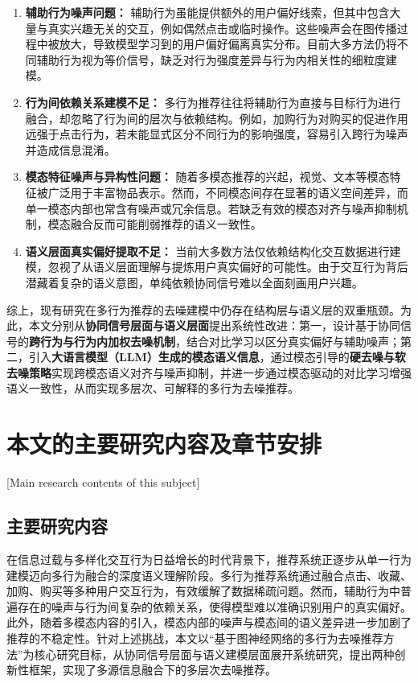 \begin{enumerate}[label={(\alph*)}]
    \item \textbf{辅助行为噪声问题：} 辅助行为虽能提供额外的用户偏好线索，但其中包含大量与真实兴趣无关的交互，例如偶然点击或临时操作。这些噪声会在图传播过程中被放大，导致模型学习到的用户偏好偏离真实分布。目前大多方法仍将不同辅助行为视为等价信号，缺乏对行为强度差异与行为内相关性的细粒度建模。

    \item \textbf{行为间依赖关系建模不足：} 多行为推荐往往将辅助行为直接与目标行为进行融合，却忽略了行为间的层次与依赖结构。例如，加购行为对购买的促进作用远强于点击行为，若未能显式区分不同行为的影响强度，容易引入跨行为噪声并造成信息混淆。

    \item \textbf{模态特征噪声与异构性问题：} 随着多模态推荐的兴起，视觉、文本等模态特征被广泛用于丰富物品表示。然而，不同模态间存在显著的语义空间差异，而单一模态内部也常含有噪声或冗余信息。若缺乏有效的模态对齐与噪声抑制机制，模态融合反而可能削弱推荐的语义一致性。

    \item \textbf{语义层面真实偏好提取不足：} 当前大多数方法仅依赖结构化交互数据进行建模，忽视了从语义层面理解与提炼用户真实偏好的可能性。由于交互行为背后潜藏着复杂的语义意图，单纯依赖协同信号难以全面刻画用户兴趣。
\end{enumerate}

综上，现有研究在多行为推荐的去噪建模中仍存在结构层与语义层的双重瓶颈。为此，本文分别从\textbf{协同信号层面与语义层面}提出系统性改进：第一，设计基于协同信号的\textbf{跨行为与行为内加权去噪机制}，结合对比学习以区分真实偏好与辅助噪声；第二，引入\textbf{大语言模型（LLM）生成的模态语义信息}，通过模态引导的\textbf{硬去噪与软去噪策略}实现跨模态语义对齐与噪声抑制，并进一步通过模态驱动的对比学习增强语义一致性，从而实现多层次、可解释的多行为去噪推荐。

\section{本文的主要研究内容及章节安排}[Main research contents of this subject]


\subsection{主要研究内容}
在信息过载与多样化交互行为日益增长的时代背景下，推荐系统正逐步从单一行为建模迈向多行为融合的深度语义理解阶段。多行为推荐系统通过融合点击、收藏、加购、购买等多种用户交互行为，有效缓解了数据稀疏问题。然而，辅助行为中普遍存在的噪声与行为间复杂的依赖关系，使得模型难以准确识别用户的真实偏好。此外，随着多模态内容的引入，模态内部的噪声与模态间的语义差异进一步加剧了推荐的不稳定性。针对上述挑战，本文以“基于图神经网络的多行为去噪推荐方法”为核心研究目标，从协同信号层面与语义建模层面展开系统研究，提出两种创新性框架，实现了多源信息融合下的多层次去噪推荐。

